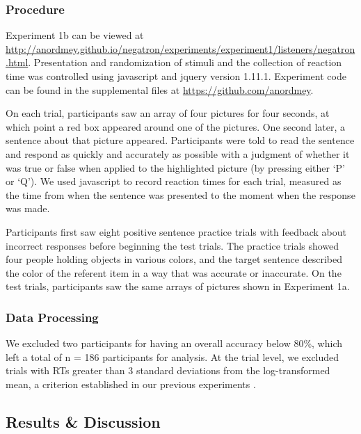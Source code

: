 \documentclass[man, floatsintext, noapacite]{apa6}
\begin{document}
\subsubsection{Procedure}

Experiment 1b can be viewed at \url{http://anordmey.github.io/negatron/experiments/experiment1/listeners/negatron.html}. Presentation and randomization of stimuli and the collection of reaction time was controlled using javascript and jquery version 1.11.1. Experiment code can be found in the supplemental files at  \url{https://github.com/anordmey}.

On each trial, participants saw an array of four pictures for four seconds, at which point a red box appeared around one of the pictures. One second later, a sentence about that picture appeared. Participants were told to read the sentence and respond as quickly and accurately as possible with a judgment of whether it was true or false when applied to the highlighted picture (by pressing either `P' or `Q').  We used javascript to record reaction times for each trial, measured as the time from when the sentence was presented to the moment when the response was made.

Participants first saw eight positive sentence practice trials with feedback about incorrect responses before beginning the test trials. The practice trials showed four people holding objects in various colors, and the target sentence described the color of the referent item in a way that was accurate or inaccurate. On the test trials, participants saw the same arrays of pictures shown in Experiment 1a. 

\subsubsection{Data Processing} 

We excluded two participants for having an overall accuracy below 80\%, which left a total of n = 186 participants for analysis. At the trial level, we excluded trials with RTs greater than 3 standard deviations from the log-transformed mean, a criterion established in our previous experiments \cite{nordmeyer2014}. 

\subsection{Results \& Discussion}
\end{document}
